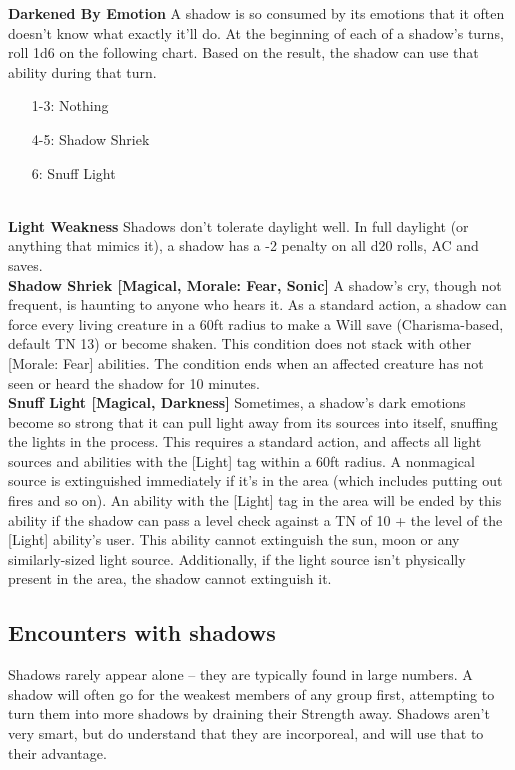\documentclass[10pt]{article}
\begin{document}
\begin{longtabu}
{\bf Darkened By Emotion} A shadow is so consumed by its emotions that it often doesn't know what exactly it'll do. At the beginning of each of a shadow's turns, roll 1d6 on the following chart. Based on the result, the shadow can use that ability during that turn.\begin{enumerate}
\item[1-3:] Nothing
\item[4-5:] Shadow Shriek
\item[6:] Snuff Light
\end{enumerate}\\
{\bf Light Weakness} Shadows don't tolerate daylight well. In full daylight (or anything that mimics it), a shadow has a -2 penalty on all d20 rolls, AC and saves.\\
{\bf Shadow Shriek [Magical, Morale: Fear, Sonic]} A shadow's cry, though not frequent, is haunting to anyone who hears it. As a standard action, a shadow can force every living creature in a 60ft radius to make a Will save (Charisma-based, default TN 13) or become shaken. This condition does not stack with other [Morale: Fear] abilities. The condition ends when an affected creature has not seen or heard the shadow for 10 minutes.\\
{\bf Snuff Light [Magical, Darkness]} Sometimes, a shadow's dark emotions become so strong that it can pull light away from its sources into itself, snuffing the lights in the process. This requires a standard action, and affects all light sources and abilities with the [Light] tag within a 60ft radius. A nonmagical source is extinguished immediately if it's in the area (which includes putting out fires and so on). An ability with the [Light] tag in the area will be ended by this ability if the shadow can pass a level check against a TN of 10 + the level of the [Light] ability's user.
This ability cannot extinguish the sun, moon or any similarly-sized light source. Additionally, if the light source isn't physically present in the area, the shadow cannot extinguish it.\\
\bottomrule
\end{longtabu}

\subsection{Encounters with shadows}

Shadows rarely appear alone -- they are typically found in large numbers. A shadow will often go for the weakest members of any group first, attempting to turn them into more shadows by draining their Strength away. Shadows aren't very smart, but do understand that they are incorporeal, and will use that to their advantage.
\end{document}
